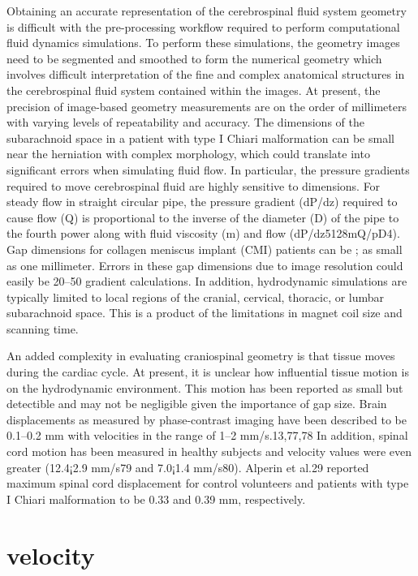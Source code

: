 \documentclass{report}
\begin{document}
Obtaining an accurate representation of the cerebrospinal
fluid system geometry is difficult with the
pre-processing workflow required to perform computational
fluid dynamics simulations. To perform these
simulations, the geometry images need to be segmented
and smoothed to form the numerical geometry
which involves difficult interpretation of the fine and
complex anatomical structures in the cerebrospinal
fluid system contained within the images. At present,
the precision of image-based geometry measurements
are on the order of millimeters with varying levels of
repeatability and accuracy. The dimensions of the
subarachnoid space in a patient with type I Chiari
malformation can be small near the herniation with
complex morphology, which could translate into
significant errors when simulating fluid flow. In
particular, the pressure gradients required to move
cerebrospinal fluid are highly sensitive to dimensions.
For steady flow in straight circular pipe, the pressure
gradient (dP/dz) required to cause flow (Q) is
proportional to the inverse of the diameter (D) of
the pipe to the fourth power along with fluid viscosity
(m) and flow (dP/dz5128mQ/pD4). Gap dimensions
for collagen meniscus implant (CMI) patients can be ;
as small as one millimeter. Errors in these gap
dimensions due to image resolution could easily be
20–50%
gradient calculations. In addition, hydrodynamic
simulations are typically limited to local regions of
the cranial, cervical, thoracic, or lumbar subarachnoid
space. This is a product of the limitations in
magnet coil size and scanning time.

An added complexity in evaluating craniospinal
geometry is that tissue moves during the cardiac cycle.
At present, it is unclear how influential tissue motion is
on the hydrodynamic environment. This motion has
been reported as small but detectible and may not be
negligible given the importance of gap size. Brain
displacements as measured by phase-contrast imaging
have been described to be 0.1–0.2 mm with velocities
in the range of 1–2 mm/s.13,77,78 In addition, spinal
cord motion has been measured in healthy subjects
and velocity values were even greater (12.4¡2.9
mm/s79 and 7.0¡1.4 mm/s80). Alperin et al.29 reported
maximum spinal cord displacement for control volunteers
and patients with type I Chiari malformation to
be 0.33 and 0.39 mm, respectively.

\section{velocity}
\end{document}
